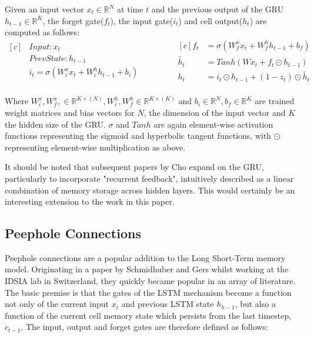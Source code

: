 \documentclass{article} %
\begin{document}
Given an input vector $x_{t} \in \mathbb{R}^{N}$ at time $t$ and the previous output of the GRU $h_{t-1} \in \mathbb{R}^{K}$, the forget gate($f_{t}$), the input gate($i_{t}$) and cell output($h_{t}$)  are computed as follows:
\begin{equation}
\begin{aligned}[c]
         &Input: x_{t}  \\
         &Prev State: h_{t-1} \\
    	 &i_{t} = \sigma(W_{i}^{x}x_{t} + W_{i}^{h} h_{t-1} + b_{i})\\
    \end{aligned}
    \qquad \qquad
    \begin{aligned}[c]
    f_{t} &= \sigma(W_{f}^{x}x_{t} + W_{f}^{h} h_{t-1} + b_{f})\\
    \tilde{h_{t}} &= Tanh(W x_{t} + f_{t} \odot h_{t-1})\\
    h_{t} &= i_{t} \odot h_{t-1} + (1- z_{t}) \odot \tilde{h_t}  \\
    \end{aligned}
\end{equation}

Where $W_{i}^{x}, W_{f}^{x}, \in \mathbb{R}^{K \times(N)}, W_{i}^{h}, W_{f}^{h} \in \mathbb{R}^{K \times(K)}$ and $b_{i} \in \mathbb{R}^{N}, b_{f} \in \mathbb{R}^{K}$ are trained weight matrices and bias vectors for $N$, the dimension of the input vector and $K$ the hidden size of the GRU. $\sigma$ and $Tanh$ are again element-wise activation functions representing the sigmoid and hyperbolic tangent functions, with $\odot$ representing element-wise multiplication as above. 

It should be noted that subsequent papers by Cho expand on the GRU, particularly to incorporate "recurrent feedback", intuitively described as a linear combination of memory storage across hidden layers. This would certainly be an interesting extension to the work in this paper.


\subsection{Peephole Connections}
\label{sec:nn/peephole}

Peephole connections are a popular addition to the Long Short-Term memory model\cite{peepholeconnections}. Originating in a paper by Schmidhuber and Gers whilst working at the IDSIA lab in Switzerland, they quickly became popular in an array of literature. The basic premise is that the gates of the LSTM mechanism become a function not only of the current input $x_{t}$ and previous LSTM state $h_{h-1}$, but also a function of the current cell memory state which persists from the last timestep,  $c_{t-1}$. The input, output and forget gates are therefore defined as follows:
\end{document}
